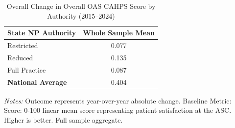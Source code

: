 \begin{table}[htbp]
    \centering
    \caption{Overall Change in Overall OAS CAHPS Score by Authority (2015--2024)}
    \label{tab:d_oas_100_score_full}
    \vspace{0.2cm}
    \begin{tabular}{lc}
        \toprule
        \textbf{State NP Authority} & \textbf{Whole Sample Mean} \\
        \midrule
        Restricted & 0.077 \\
        Reduced & 0.135 \\
        Full Practice & 0.087 \\
        \midrule
        \textbf{National Average} & 0.404 \\
        \bottomrule
    \end{tabular}
    \vspace{0.1cm}
    \begin{minipage}{0.6\textwidth}
        \footnotesize \textit{Notes:} Outcome represents year-over-year absolute change. Baseline Metric: Score: 0-100 linear mean score representing patient satisfaction at the ASC. Higher is better. Full sample aggregate.
    \end{minipage}
\end{table}